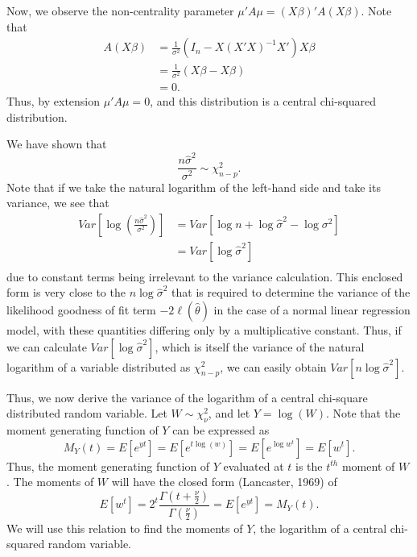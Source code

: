 Now, we observe the non-centrality parameter $\mu 'A \mu = (X \beta)'A(X \beta)$. Note that
\begin{equation*}
	\begin{split}
	A(X \beta) & = \frac{1}{\sigma^2} (I_n - X (X' X)^{-1} X')X\beta  \\ 
	& = \frac{1}{\sigma^2} (X \beta - X \beta) \\
	& = 0 .
	\end{split}
\end{equation*}
Thus, by extension $\mu 'A \mu = 0$, and this distribution is a central chi-squared distribution.

We have shown that
\begin{equation}
	\frac{n \hat{\sigma}^2}{\sigma^2} \sim \chi^2_{n-p} .
\end{equation}
Note that if we take the natural logarithm of the left-hand side and take its variance, we see that
\begin{equation}
	\begin{split}
		Var \left[ \log(\frac{n \hat{\sigma}^2}{\sigma^2}) \right] & = Var \left[ \log n + \log \hat{\sigma}^2 - \log \sigma^2 \right]  \\ 
		& = Var \left[ \log \hat{\sigma}^2 \right] \\
	\end{split}
\end{equation}
due to constant terms being irrelevant to the variance calculation. This enclosed form is very close to the $n \log \hat{\sigma}^2$ that is required
to determine the variance of the likelihood goodness of fit term $-2 \ell (\hat{\theta} )$ in the case of a normal linear regression model, with these
quantities differing only by a multiplicative constant. Thus, if we can calculate $Var \left[ \log \hat{\sigma}^2 \right]$, which is itself the variance
of the natural logarithm of a variable distributed as $\chi^2_{n-p}$, we can easily obtain $Var \left[ n \log \hat{\sigma}^2 \right]$.

Thus, we now derive the variance of the logarithm of a central chi-square distributed random variable. Let $W \sim \chi^2_{\nu}$, and let $Y = \log(W)$. Note that
the moment generating function of $Y$ can be expressed as
\begin{equation*}
	M_Y (t) = E \left[ e^{yt} \right] = E \left[ e^{t\log(w)} \right] = E \left[ e^{\log w^t} \right] = E \left[ w^t \right] .
\end{equation*}
Thus, the moment generating function of $Y$ evaluated at $t$ is the $t^{th}$ moment of $W$. The moments of $W$ will have the
closed form (Lancaster, 1969) of
\begin{equation*}
	E \left[ w^t \right] = 2^t \frac{\Gamma (t + \frac{\nu}{2})}{\Gamma (\frac{\nu}{2})} = E \left[ e^{yt} \right] = M_Y (t) .
\end{equation*}
We will use this relation to find the moments of $Y$, the logarithm of a central chi-squared random variable.

